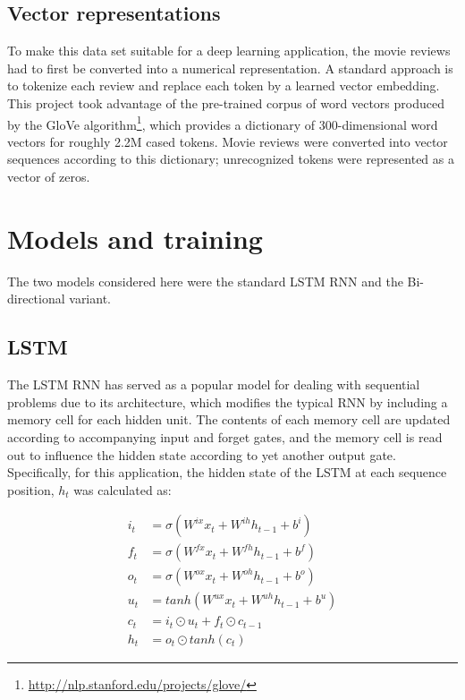 \documentclass[a4paper]{article}
\begin{document}
\subsection{Vector representations}

To make this data set suitable for a deep learning application, the movie reviews had to first be converted into a numerical representation. A standard approach is to tokenize each review and replace each token by a learned vector embedding. This project took advantage of the pre-trained corpus of word vectors produced by the GloVe algorithm\footnote{\href{http://nlp.stanford.edu/projects/glove/}{http://nlp.stanford.edu/projects/glove/}}, which provides a dictionary of 300-dimensional word vectors for roughly 2.2M cased tokens. Movie reviews were converted into vector sequences according to this dictionary; unrecognized tokens were represented as a vector of zeros.


\section{Models and training}

The two models considered here were the standard LSTM RNN and the Bi-directional variant.

\subsection{LSTM}

The LSTM RNN has served as a popular model for dealing with sequential problems due to its architecture, which modifies the typical RNN by including a memory cell for each hidden unit. The contents of each memory cell are updated according to accompanying input and forget gates, and the memory cell is read out to influence the hidden state according to yet another output gate. Specifically, for this application, the hidden state of the LSTM at each sequence position, $h_t$ was calculated as:

\begin{align}
i_t &= \sigma(W^{ix}x_t + W^{ih}h_{t-1} + b^{i})\\
f_t &= \sigma(W^{fx}x_t + W^{fh}h_{t-1} + b^{f})\\
o_t &= \sigma(W^{ox}x_t + W^{oh}h_{t-1} + b^{o})\\
u_t &= tanh(W^{ux}x_t + W^{uh}h_{t-1} + b^{u})\\
c_t &= i_t\odot u_t + f_t \odot c_{t-1}\\
h_t &= o_t\odot tanh(c_t)
\end{align}
\end{document}
